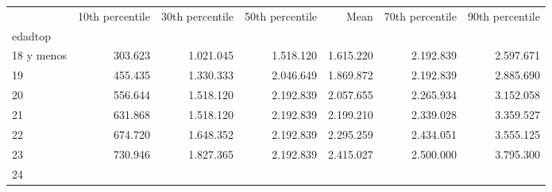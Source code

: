 \begin{tabular}{lllllll}
\cline{1-7}
\multicolumn{1}{c}{} &
  \multicolumn{1}{|r}{10th percentile} &
  \multicolumn{1}{r}{30th percentile} &
  \multicolumn{1}{r}{50th percentile} &
  \multicolumn{1}{r}{Mean} &
  \multicolumn{1}{r}{70th percentile} &
  \multicolumn{1}{r}{90th percentile} \\
\cline{1-7}
\multicolumn{1}{l}{edadtop} &
  \multicolumn{1}{|r}{} &
  \multicolumn{1}{r}{} &
  \multicolumn{1}{r}{} &
  \multicolumn{1}{r}{} &
  \multicolumn{1}{r}{} &
  \multicolumn{1}{r}{} \\
\multicolumn{1}{l}{\hspace{1em}18 y menos} &
  \multicolumn{1}{|r}{303.623} &
  \multicolumn{1}{r}{1.021.045} &
  \multicolumn{1}{r}{1.518.120} &
  \multicolumn{1}{r}{1.615.220} &
  \multicolumn{1}{r}{2.192.839} &
  \multicolumn{1}{r}{2.597.671} \\
\multicolumn{1}{l}{\hspace{1em}19} &
  \multicolumn{1}{|r}{455.435} &
  \multicolumn{1}{r}{1.330.333} &
  \multicolumn{1}{r}{2.046.649} &
  \multicolumn{1}{r}{1.869.872} &
  \multicolumn{1}{r}{2.192.839} &
  \multicolumn{1}{r}{2.885.690} \\
\multicolumn{1}{l}{\hspace{1em}20} &
  \multicolumn{1}{|r}{556.644} &
  \multicolumn{1}{r}{1.518.120} &
  \multicolumn{1}{r}{2.192.839} &
  \multicolumn{1}{r}{2.057.655} &
  \multicolumn{1}{r}{2.265.934} &
  \multicolumn{1}{r}{3.152.058} \\
\multicolumn{1}{l}{\hspace{1em}21} &
  \multicolumn{1}{|r}{631.868} &
  \multicolumn{1}{r}{1.518.120} &
  \multicolumn{1}{r}{2.192.839} &
  \multicolumn{1}{r}{2.199.210} &
  \multicolumn{1}{r}{2.339.028} &
  \multicolumn{1}{r}{3.359.527} \\
\multicolumn{1}{l}{\hspace{1em}22} &
  \multicolumn{1}{|r}{674.720} &
  \multicolumn{1}{r}{1.648.352} &
  \multicolumn{1}{r}{2.192.839} &
  \multicolumn{1}{r}{2.295.259} &
  \multicolumn{1}{r}{2.434.051} &
  \multicolumn{1}{r}{3.555.125} \\
\multicolumn{1}{l}{\hspace{1em}23} &
  \multicolumn{1}{|r}{730.946} &
  \multicolumn{1}{r}{1.827.365} &
  \multicolumn{1}{r}{2.192.839} &
  \multicolumn{1}{r}{2.415.027} &
  \multicolumn{1}{r}{2.500.000} &
  \multicolumn{1}{r}{3.795.300} \\
\multicolumn{1}{l}{\hspace{1em}24} &

\end{tabular}
